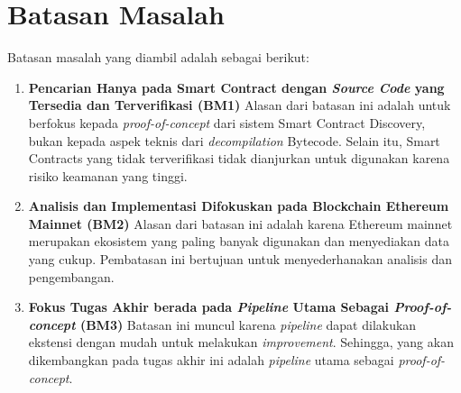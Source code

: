 \section{Batasan Masalah}
\label{sec:batasan-masalah}


Batasan masalah yang diambil adalah sebagai berikut:

\begin{enumerate}
	\item \textbf{Pencarian Hanya pada Smart Contract dengan \textit{Source Code} yang Tersedia dan Terverifikasi (BM1)} \newline
	      Alasan dari batasan ini adalah untuk berfokus kepada \textit{proof-of-concept} dari sistem Smart Contract Discovery, bukan kepada aspek teknis dari \textit{decompilation} Bytecode. Selain itu, Smart Contracts yang tidak terverifikasi tidak dianjurkan untuk digunakan karena risiko keamanan yang tinggi.

	\item \textbf{Analisis dan Implementasi Difokuskan pada Blockchain Ethereum Mainnet (BM2)} \newline
	      Alasan dari batasan ini adalah karena Ethereum mainnet merupakan ekosistem yang paling banyak digunakan dan menyediakan data yang cukup. Pembatasan ini bertujuan untuk menyederhanakan analisis dan pengembangan.

	\item \textbf{Fokus Tugas Akhir berada pada \textit{Pipeline} Utama Sebagai \textit{Proof-of-concept} (BM3)} \newline
	      Batasan ini muncul karena \textit{pipeline} dapat dilakukan ekstensi dengan mudah untuk melakukan \textit{improvement}. Sehingga, yang akan dikembangkan pada tugas akhir ini adalah \textit{pipeline} utama sebagai \textit{proof-of-concept}.
\end{enumerate}